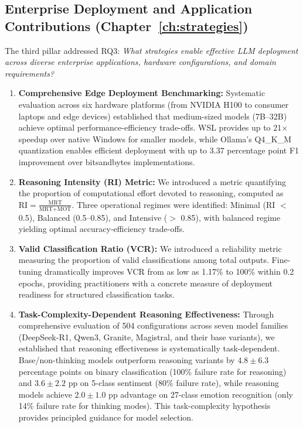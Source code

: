 \subsection{Enterprise Deployment and Application Contributions (Chapter~\ref{ch:strategies})}

The third pillar addressed RQ3: \textit{What strategies enable effective LLM deployment across diverse enterprise applications, hardware configurations, and domain requirements?}

\begin{enumerate}[leftmargin=*]
    \item \textbf{Comprehensive Edge Deployment Benchmarking:} Systematic evaluation across six hardware platforms (from NVIDIA H100 to consumer laptops and edge devices) established that medium-sized models (7B--32B) achieve optimal performance-efficiency trade-offs. WSL provides up to 21$\times$ speedup over native Windows for smaller models, while Ollama's Q4\_K\_M quantization enables efficient deployment with up to 3.37 percentage point F1 improvement over bitsandbytes implementations.
    
    \item \textbf{Reasoning Intensity (RI) Metric:} We introduced a metric quantifying the proportion of computational effort devoted to reasoning, computed as $\text{RI} = \frac{\text{MRT}}{\text{MRT} + \text{MOT}}$. Three operational regimes were identified: Minimal (RI $<$ 0.5), Balanced (0.5--0.85), and Intensive ($>$ 0.85), with balanced regime yielding optimal accuracy-efficiency trade-offs.
    
    \item \textbf{Valid Classification Ratio (VCR):} We introduced a reliability metric measuring the proportion of valid classifications among total outputs. Fine-tuning dramatically improves VCR from as low as 1.17\% to 100\% within 0.2 epochs, providing practitioners with a concrete measure of deployment readiness for structured classification tasks.
    
    \item \textbf{Task-Complexity-Dependent Reasoning Effectiveness:} Through comprehensive evaluation of 504 configurations across seven model families (DeepSeek-R1, Qwen3, Granite, Magistral, and their base variants), we established that reasoning effectiveness is systematically task-dependent. Base/non-thinking models outperform reasoning variants by $4.8 \pm 6.3$ percentage points on binary classification (100\% failure rate for reasoning) and $3.6 \pm 2.2$ pp on 5-class sentiment (80\% failure rate), while reasoning models achieve $2.0 \pm 1.0$ pp advantage on 27-class emotion recognition (only 14\% failure rate for thinking modes). This task-complexity hypothesis provides principled guidance for model selection.
    

\end{enumerate}
